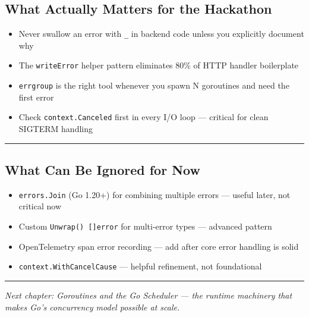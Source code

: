 \documentclass[11pt,openany]{book}
\providecommand{\tightlist}{%
  \setlength{\itemsep}{0pt}\setlength{\parskip}{0pt}}
\begin{document}
\hypertarget{what-actually-matters-for-the-hackathon-3}{%
\subsection{What Actually Matters for the
Hackathon}\label{what-actually-matters-for-the-hackathon-3}}

\begin{itemize}
\tightlist
\item
  Never swallow an error with \texttt{\_} in backend code unless you
  explicitly document why
\item
  The \texttt{writeError} helper pattern eliminates 80\% of HTTP handler
  boilerplate
\item
  \texttt{errgroup} is the right tool whenever you spawn N goroutines
  and need the first error
\item
  Check \texttt{context.Canceled} first in every I/O loop --- critical
  for clean SIGTERM handling
\end{itemize}

\begin{center}\rule{0.5\linewidth}{0.5pt}\end{center}

\hypertarget{what-can-be-ignored-for-now-3}{%
\subsection{What Can Be Ignored for
Now}\label{what-can-be-ignored-for-now-3}}

\begin{itemize}
\tightlist
\item
  \texttt{errors.Join} (Go 1.20+) for combining multiple errors ---
  useful later, not critical now
\item
  Custom \texttt{Unwrap()\ {[}{]}error} for multi-error types ---
  advanced pattern
\item
  OpenTelemetry span error recording --- add after core error handling
  is solid
\item
  \texttt{context.WithCancelCause} --- helpful refinement, not
  foundational
\end{itemize}

\begin{center}\rule{0.5\linewidth}{0.5pt}\end{center}

\emph{Next chapter: Goroutines and the Go Scheduler --- the runtime
machinery that makes Go's concurrency model possible at scale.}
\end{document}
